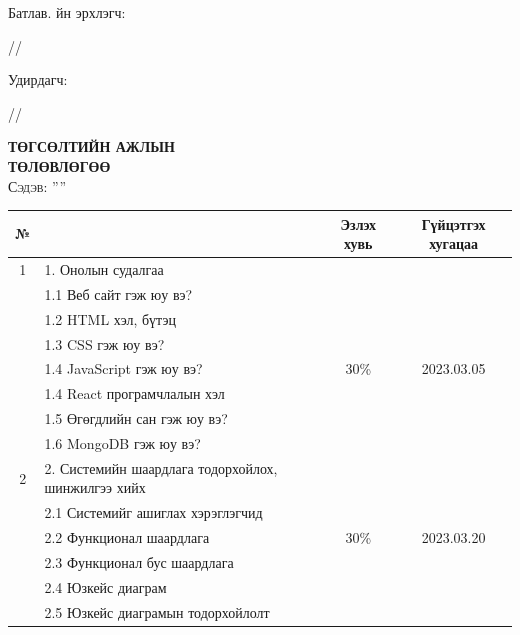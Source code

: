 
\begin{titlepage}

\vspace*{0.5cm}
Батлав. \deptname йн эрхлэгч: 
\begin{flushright}
\makebox[4cm]{\dotfill} /\chairname/ 
\end{flushright}

Удирдагч: 
\begin{flushright}
\makebox[4cm]{\dotfill} /\supname/
\end{flushright}

\begin{center}

\vspace*{2cm}
\textbf{{\large ТӨГСӨЛТИЙН АЖЛЫН \\ ТӨЛӨВЛӨГӨӨ}}\\[0.5cm]

\textsc{\large Сэдэв: ''\ttitle''}\\[0.5cm]

\begin{tabular}{|c|p{7cm}|c|c|}
	\hline
	№ & \makebox[7cm][c]{Судалгааны ажлын бүлэг, хэсгүүдийн нэр} & Эзлэх хувь & Гүйцэтгэх хугацаа \\ \hline
	1 & {1. Онолын судалгаа} & & \\
	& 1.1 Веб сайт гэж юу вэ? & & \\
	& 1.2 HTML хэл, бүтэц & & \\ 
	& 1.3 CSS гэж юу вэ? &  & \\ 
	& 1.4 JavaScript гэж юу вэ? & 30\% &  2023.03.05\\
	& 1.4 React програмчлалын хэл & & \\
    & 1.5 Өгөгдлийн сан гэж юу вэ? & & \\
    & 1.6 MongoDB гэж юу вэ? & & \\ \hline
    
	2 & {2. Системийн шаардлага тодорхойлох, шинжилгээ хийх} & & \\
	& 2.1 Системийг ашиглах хэрэглэгчид & & \\
    & 2.2 Функционал шаардлага & 30\% & 2023.03.20\\
    & 2.3 Функционал бус шаардлага& & \\
    & 2.4 Юзкейс диаграм& & \\
    & 2.5 Юзкейс диаграмын тодорхойлолт& & \\ \hline


\end{tabular}
\end{center}
\end{titlepage}
